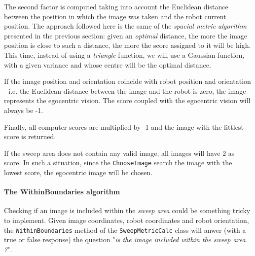 %
The second factor is computed taking into account the Euclidean 
distance between the position in which the image was taken 
and the robot current position. 
%
The approach followed here is the same of the \textit{spacial 
metric algorithm} presented in the previous section: 
given an \textit{optimal} distance, the more the image position 
is close to such a distance, the more the score assigned 
to it will be high.
%
This time, instead of using a \textit{triangle} function, 
we will use a Gaussian function, with a given variance and 
whose centre will be the optimal distance.
%

%
If the image position and orientation coincide with robot position 
and orientation - i.e. the Euclidean distance between the image and 
the robot is zero, the image represents the egocentric vision. 
The score coupled with the egocentric vision will 
always be -1.
%

%
Finally, all computer scores are multiplied by -1 and 
the image with the littlest score is returned.
%

%
If the sweep area does not contain any valid image, all images will
have 2 as score. In such a situation, since the \texttt{ChooseImage} 
search the image with the lowest score, the egocentric image 
will be chosen.
%
\paragraph{The WithinBoundaries algorithm}
\label{par:withinboundaries}
%
Checking if an image is included within the \textit{sweep area}
could be something tricky to implement. Given image coordinates, 
robot coordinates and robot orientation, the \texttt{WithinBoundaries} 
method of the \texttt{SweepMetricCalc} class 
will anwer (with a true or false response) the question
"\textit{is the image included within the sweep area ?}".
%

